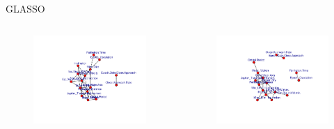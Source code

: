 \documentclass{beamer}
\begin{document}
\begin{frame}{GLASSO}
\begin{columns}
  \begin{figure}[b]{\textwidth}
    \centering
    \includegraphics[width=\textwidth]{Pic/GLASSO_0.1.pdf}
  \end{figure} 
  \begin{figure}[b]{\textwidth}
    \centering
    \includegraphics[width=\textwidth]{Pic/GLASSO_0.2.pdf}
  \end{figure}
\end{columns}
\end{frame}
\end{document}
